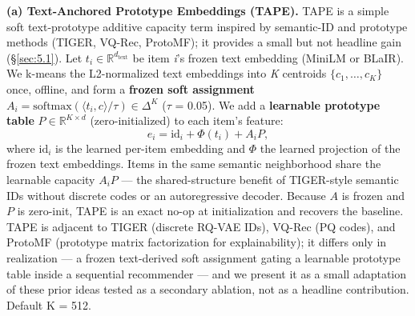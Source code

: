\textbf{(a) Text-Anchored Prototype Embeddings (TAPE).} TAPE is a simple soft text-prototype additive capacity term inspired by semantic-ID and prototype methods (TIGER, VQ-Rec, ProtoMF); it provides a small but not headline gain (\S\ref{sec:5.1}). Let $t_i \in \mathbb{R}^{d_{\text{text}}}$ be item \emph{i}'s frozen text embedding (MiniLM or BLaIR). We k-means the L2-normalized text embeddings into \emph{K} centroids $\{c_1,\ldots,c_K\}$ once, offline, and form a \textbf{frozen soft assignment} $A_i = \mathrm{softmax}(\langle t_i, c\rangle / \tau) \in \Delta^{K}$ ($\tau$ = 0.05). We add a \textbf{learnable prototype table} $P \in \mathbb{R}^{K\times d}$ (zero-initialized) to each item's feature:
\begin{equation*}
  e_i = \mathrm{id}_i + \Phi(t_i) + A_i P,
\end{equation*}
where $\mathrm{id}_i$ is the learned per-item embedding and $\Phi$ the learned projection of the frozen text embeddings. Items in the same semantic neighborhood share the learnable capacity $A_i P$ --- the shared-structure benefit of TIGER-style semantic IDs \citep{rajput2023tiger} without discrete codes or an autoregressive decoder. Because $A$ is frozen and $P$ is zero-init, TAPE is an exact no-op at initialization and recovers the baseline. TAPE is adjacent to TIGER (discrete RQ-VAE IDs), VQ-Rec \citep{hou2023vqrec} (PQ codes), and ProtoMF \citep{melchiorre2022protomf} (prototype matrix factorization for explainability); it differs only in realization --- a frozen text-derived soft assignment gating a learnable prototype table inside a sequential recommender --- and we present it as a small adaptation of these prior ideas tested as a secondary ablation, not as a headline contribution. Default K = 512.

